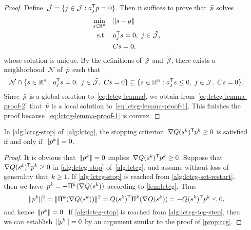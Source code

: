 \begin{proof}
    Define~$\tilde{\mathcal{J}} = \set{j \in \mathcal{J} : a_j^{\T} \tilde{\pstep} = 0}$.
    Then it suffices to prove that~$\tilde{\pstep}$ solves
    \begin{subequations}
        \label{eq:lctcg-lemma-proof-1}
        \begin{align}
            \min_{\sstep \in \R^n}  & \quad \norm{\sstep - g}\\
            \text{s.t.}             & \quad a_j^{\T} \sstep = 0, ~ j \in \tilde{\mathcal{J}},\\
                                    & \quad C \sstep = 0,
        \end{align}
    \end{subequations}
    whose solution is unique.
    By the definitions of~$\mathcal{J}$ and~$\tilde{\mathcal{J}}$, there exists a neighborhood~$\mathcal{N}$ of~$\tilde{\pstep}$ such that
    \begin{equation}
        \label{eq:lctcg-lemma-proof-2}
        \mathcal{N} \cap \set{\sstep \in \R^n : a_j^{\T} \sstep = 0, ~ j \in \tilde{\mathcal{J}}, ~ C \sstep = 0} \subseteq \set{\sstep \in \R^n : a_j^{\T} \sstep \le 0, ~ j \in \mathcal{J}, ~ C \sstep = 0}.
    \end{equation}
    Since~$\tilde{\pstep}$ is a global solution to~\cref{eq:lctcg-lemma}, we obtain from~\cref{eq:lctcg-lemma-proof-2} that~$\tilde{\pstep}$ is a local solution to~\cref{eq:lctcg-lemma-proof-1}.
    This finishes the proof because~\cref{eq:lctcg-lemma-proof-1} is convex.
\end{proof}


\begin{proposition}
    \label{prop:lctcg}
    In \cref{alg:lctcg-stop} of~\cref{alg:lctcg}, the stopping criterion~$\nabla Q (\sstep[k])^{\T} \pstep[k] \ge 0$ is satisfied if and only if~$\norm{\pstep[k]} = 0$.
\end{proposition}

\begin{proof}
    It is obvious that~$\norm{\pstep[k]} = 0$ implies~$\nabla Q (\sstep[k])^{\T} \pstep[k] \ge 0$.
    Suppose that~$\nabla Q (\sstep[k])^{\T} \pstep[k] \ge 0$ in \cref{alg:lctcg-stop} of~\cref{alg:lctcg}, and assume without loss of generality that~$k \ge 1$.
    If \cref{alg:lctcg-stop} is reached from \cref{alg:lctcg-set-restart}, then we have~$\pstep[k] = -\Pi^k(\nabla Q(\sstep[k]))$ according to \cref{lem:lctcg}.
    Thus
    \begin{equation*}
        \norm{\pstep[k]}^2 = \norm{\Pi^k(\nabla Q(\sstep[k]))}^2 = Q (\sstep[k])^{\T}  \Pi^k(\nabla Q(\sstep[k])) = - Q (\sstep[k])^{\T}  \pstep[k] \le 0,
    \end{equation*}
    and hence~$\norm{\pstep[k]} = 0$.
    If \cref{alg:lctcg-stop} is reached from \cref{alg:lctcg-tcg-step}, then we can establish~$\norm{\pstep[k]} = 0$ by an argument similar to the proof of \cref{prop:tcg}.
\end{proof}

